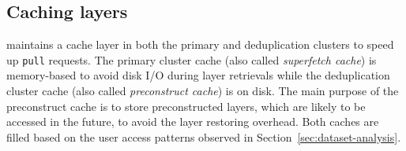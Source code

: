 
\subsection{Caching layers}
\label{sec:cache-design}


%


\sysname maintains a cache layer in both the primary and deduplication clusters to speed up
\texttt{pull} requests. The primary cluster cache (also called \emph{superfetch cache}) is
memory-based to avoid disk I/O during layer retrievals while the deduplication cluster cache
(also called \emph{preconstruct cache}) is on disk. The main purpose of the preconstruct
cache is to store preconstructed layers, which are likely to be accessed in the future,
to avoid the layer restoring overhead.
%
Both caches are filled based on the user access patterns observed in Section~\ref{sec:dataset-analysis}.
%

